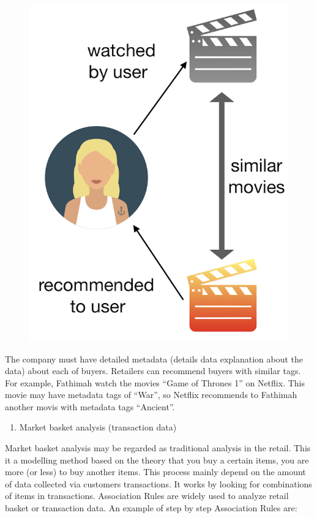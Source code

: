 \documentclass[]{book}
\providecommand{\tightlist}{%
  \setlength{\itemsep}{0pt}\setlength{\parskip}{0pt}}
\begin{document}
\begin{figure}
\centering
\includegraphics{18.png}
\caption{}
\end{figure}

The company must have detailed metadata (details data explanation about
the data) about each of buyers. Retailers can recommend buyers with
similar tags. For example, Fathimah watch the movies ``Game of Thrones
1'' on Netflix. This movie may have metadata tags of ``War'', so Netflix
recommends to Fathimah another movis with metadata tags ``Ancient''.

\begin{enumerate}
\def\labelenumi{\arabic{enumi}.}
\setcounter{enumi}{5}
\tightlist
\item
  Market basket analysis (transaction data)
\end{enumerate}

Market basket analysis may be regarded as traditional analysis in the
retail. This it a modelling method based on the theory that you buy a
certain items, you are more (or less) to buy another items. This process
mainly depend on the amount of data collected via customers
transactions. It works by looking for combinations of items in
transactions. Association Rules are widely used to analyze retail basket
or transaction data. An example of step by step Association Rules are:
\end{document}
